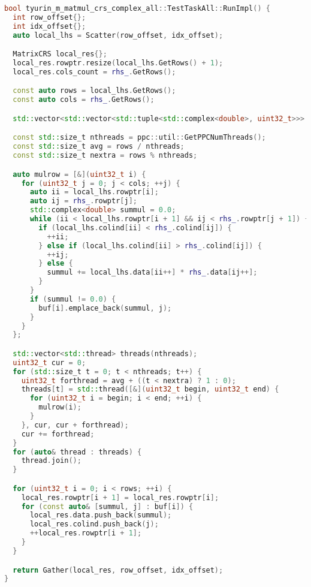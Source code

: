 \documentclass[a4paper,12pt]{article}
\begin{document}
\begin{lstlisting}[language=C++,caption={CRS-умножение матриц с использованием MPI и стандартных потоков STL}]
bool tyurin_m_matmul_crs_complex_all::TestTaskAll::RunImpl() {
  int row_offset{};
  int idx_offset{};
  auto local_lhs = Scatter(row_offset, idx_offset);

  MatrixCRS local_res{};
  local_res.rowptr.resize(local_lhs.GetRows() + 1);
  local_res.cols_count = rhs_.GetRows();

  const auto rows = local_lhs.GetRows();
  const auto cols = rhs_.GetRows();

  std::vector<std::vector<std::tuple<std::complex<double>, uint32_t>>> buf(rows);

  const std::size_t nthreads = ppc::util::GetPPCNumThreads();
  const std::size_t avg = rows / nthreads;
  const std::size_t nextra = rows % nthreads;

  auto mulrow = [&](uint32_t i) {
    for (uint32_t j = 0; j < cols; ++j) {
      auto ii = local_lhs.rowptr[i];
      auto ij = rhs_.rowptr[j];
      std::complex<double> summul = 0.0;
      while (ii < local_lhs.rowptr[i + 1] && ij < rhs_.rowptr[j + 1]) {
        if (local_lhs.colind[ii] < rhs_.colind[ij]) {
          ++ii;
        } else if (local_lhs.colind[ii] > rhs_.colind[ij]) {
          ++ij;
        } else {
          summul += local_lhs.data[ii++] * rhs_.data[ij++];
        }
      }
      if (summul != 0.0) {
        buf[i].emplace_back(summul, j);
      }
    }
  };

  std::vector<std::thread> threads(nthreads);
  uint32_t cur = 0;
  for (std::size_t t = 0; t < nthreads; t++) {
    uint32_t forthread = avg + ((t < nextra) ? 1 : 0);
    threads[t] = std::thread([&](uint32_t begin, uint32_t end) {
      for (uint32_t i = begin; i < end; ++i) {
        mulrow(i);
      }
    }, cur, cur + forthread);
    cur += forthread;
  }
  for (auto& thread : threads) {
    thread.join();
  }

  for (uint32_t i = 0; i < rows; ++i) {
    local_res.rowptr[i + 1] = local_res.rowptr[i];
    for (const auto& [summul, j] : buf[i]) {
      local_res.data.push_back(summul);
      local_res.colind.push_back(j);
      ++local_res.rowptr[i + 1];
    }
  }

  return Gather(local_res, row_offset, idx_offset);
}
\end{lstlisting}
\end{document}
